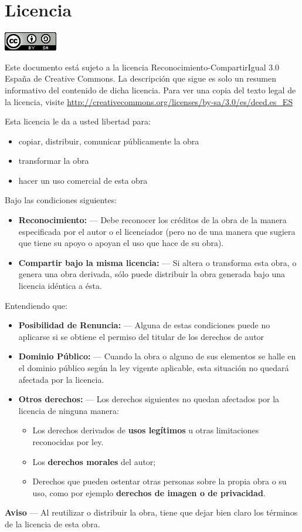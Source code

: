 \chapter*{Licencia}

\includegraphics{ccbysa-88x31.png}

Este documento está sujeto a la licencia 
Reconocimiento-CompartirIgual 3.0 España de Creative Commons.
La descripción que sigue es solo un resumen informativo del contenido de dicha licencia.
Para ver una copia del texto legal de la licencia, visite
\href{http://creativecommons.org/licenses/by-sa/3.0/es/deed.es\_ES}{http://creativecommons.org/licenses/by-sa/3.0/es/deed.es\_ES}

Esta licencia le da a usted libertad para:
\begin{itemize}
\itemsep1pt\parskip0pt
\item copiar, distribuir, comunicar públicamente la obra
\item transformar la obra
\item hacer un uso comercial de esta obra
\end{itemize}

Bajo las condiciones siguientes:
\begin{itemize}
\itemsep1pt\parskip0pt
\item
{\bf Reconocimiento:} —
Debe reconocer los créditos de la obra de la manera especificada por el autor o el licenciador (pero no de una manera que sugiera que tiene su apoyo o apoyan el uso que hace de su obra).
\item
{\bf Compartir bajo la misma licencia:} —
Si altera o transforma esta obra, o genera una obra derivada, sólo puede distribuir la obra generada bajo una licencia idéntica a ésta.
\end{itemize}

Entendiendo que:
\begin{itemize}
\itemsep1pt\parskip0pt
\item
{\bf Posibilidad de Renuncia:} —
Alguna de estas condiciones puede no aplicarse si se obtiene el permiso del titular de los derechos de autor
\item
{\bf Dominio Público:} —
Cuando la obra o alguno de sus elementos se halle en el dominio público según la ley vigente aplicable, esta situación no quedará afectada por la licencia.
\item
{\bf Otros derechos:} — 
Los derechos siguientes no quedan afectados por la licencia de ninguna manera:
\begin{itemize}
\item 
Los derechos derivados de {\bf usos legítimos} u otras limitaciones reconocidas por ley.
\item
Los {\bf derechos morales} del autor;
\item
Derechos que pueden ostentar otras personas sobre la propia obra o su uso, como por ejemplo {\bf derechos de imagen o de privacidad}.
\end{itemize}
\end{itemize}

{\bf Aviso} — Al reutilizar o distribuir la obra, tiene que dejar bien claro los términos de la licencia de esta obra.

